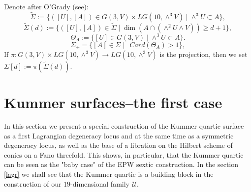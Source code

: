 \documentclass[a4paper,11pt]{amsart}
\theoremstyle{definition}
\numberwithin{equation}{section}
\numberwithin{equation}{section} \theoremstyle{definition}
\begin{document}
Denote after O'Grady (see\cite {Ogrady-michigan}):
$$\tilde{\Sigma}:=\{ ([U],[A])\in G(3,V)\times LG(10,\wedge^3 V)\;|\; \wedge^3U\subset A \},$$
$$\tilde{\Sigma}(d):=\{ ([U],[A])\in \tilde{\Sigma} \;|\; \dim(A\cap (\wedge^2U\wedge V))\geq d+1 \},$$
$$\Theta_A:=\{[U]\in G(3,V) \;|\; \wedge^3U \subset A \}.$$
$$\Sigma_{+}=\{[A]\in \Sigma \;|\; \ \ Card(\Theta_A)>1\},$$
If $\pi\colon G(3,V)\times LG(10,\wedge^3 V)\to LG(10,\wedge^3 V)$ is the projection, then we set $\Sigma[d]:=\pi(\tilde{\Sigma}(d))$.

 

  

\section{Kummer surfaces--the first case}\label{kummer}
In this section we present a special construction of the Kummer quartic surface as a first Lagrangian degeneracy locus and at the same time as a symmetric degeneracy locus,  as well as the base of a fibration on the Hilbert scheme of conics on a Fano threefold. This shows, in particular, that the Kummer quartic can be seen as the "baby case" of the EPW sextic construction.
In the section \ref{lagr} we shall see that the Kummer quartic is a building block in the construction of our $19$-dimensional family 
$\mathcal{U}$.

 
\end{document}
